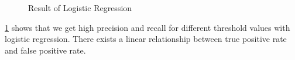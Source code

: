 \begin{figure}[H]
\centering
{}%
\hfill %
%
\caption{Result of Logistic Regression}
\label{flr}
\end{figure}
\noindent
{} \ref{flr} shows that we get high precision and recall for different threshold values with logistic regression. There exists a linear relationship between true positive rate and  false positive rate.
